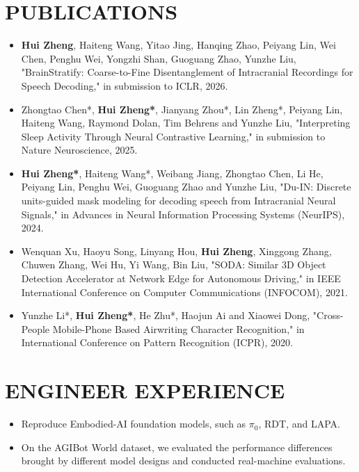\documentclass{resume}
\begin{document}
\section{{\bfseries PUBLICATIONS}}
\begin{itemize}[parsep=0.2ex]
  \item \textbf{Hui Zheng}, Haiteng Wang, Yitao Jing, Hanqing Zhao, Peiyang Lin, Wei Chen, Penghu Wei, Yongzhi Shan, Guoguang Zhao, Yunzhe Liu, "BrainStratify: Coarse-to-Fine Disentanglement of Intracranial Recordings for Speech Decoding," in submission to ICLR, 2026.
  \item Zhongtao Chen*, \textbf{Hui Zheng*}, Jianyang Zhou*, Lin Zheng*, Peiyang Lin, Haiteng Wang, Raymond Dolan, Tim Behrens and Yunzhe Liu, "Interpreting Sleep Activity Through Neural Contrastive Learning," in submission to Nature Neuroscience, 2025.
  \item \textbf{Hui Zheng*}, Haiteng Wang*, Weibang Jiang, Zhongtao Chen, Li He, Peiyang Lin, Penghu Wei, Guoguang Zhao and Yunzhe Liu, "Du-IN: Discrete units-guided mask modeling for decoding speech from Intracranial Neural Signals," in Advances in Neural Information Processing Systems (NeurIPS), 2024.
  \item Wenquan Xu, Haoyu Song, Linyang Hou, \textbf{Hui Zheng}, Xinggong Zhang, Chuwen Zhang, Wei Hu, Yi Wang, Bin Liu, "SODA: Similar 3D Object Detection Accelerator at Network Edge for Autonomous Driving," in IEEE International Conference on Computer Communications (INFOCOM), 2021.
  \item Yunzhe Li*, \textbf{Hui Zheng*}, He Zhu*, Haojun Ai and Xiaowei Dong, "Cross-People Mobile-Phone Based Airwriting Character Recognition," in International Conference on Pattern Recognition (ICPR), 2020.
\end{itemize}

\section{{\bfseries ENGINEER EXPERIENCE}}
\begin{itemize}[parsep=0.2ex]
  \item Reproduce Embodied-AI foundation models, such as $\pi_{0}$, RDT, and LAPA.
  \item On the AGIBot World dataset, we evaluated the performance differences brought by different model designs and conducted real-machine evaluations.
\end{itemize}
\end{document}
